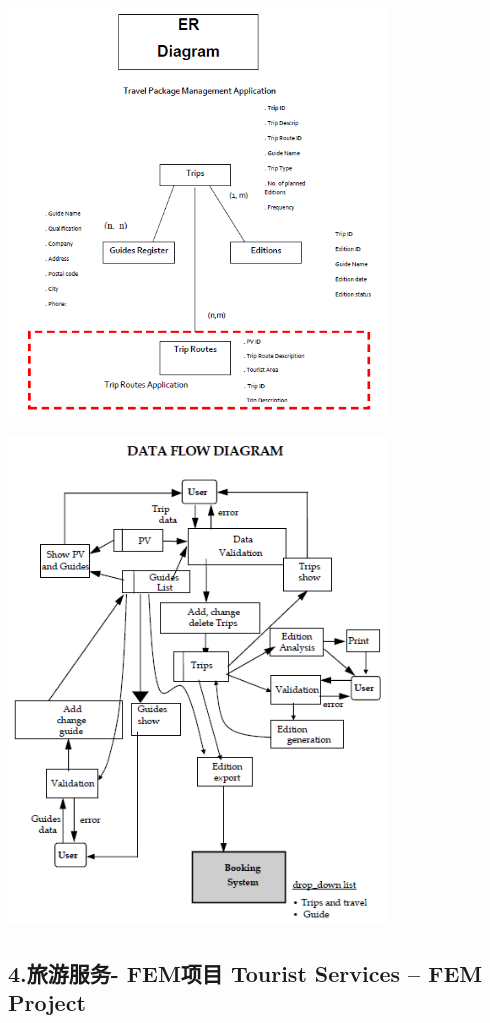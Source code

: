 
\includegraphics[width=10cm]{Sifp31.png}


\includegraphics[width=10cm]{Sifp32.png}

\hypertarget{ux65c5ux6e38ux670dux52a1--femux9879ux76ee-tourist-services-fem-project}{%
\subsection{4.旅游服务- FEM项目 Tourist Services -- FEM
Project}\label{ux65c5ux6e38ux670dux52a1--femux9879ux76ee-tourist-services-fem-project}}

